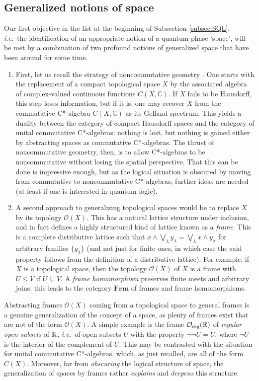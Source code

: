 \documentclass[11pt]{article}
\newcommand{\CO}{{\mathcal O}} \newcommand{\CP}{{\mathcal P}}
\newcommand{\C}{{\mathbb C}} \newcommand{\D}{{\mathbb D}}
\newcommand{\ie}{\textit{i.e.}}
\begin{document}
\subsection{Generalized notions of space}\label{subsection:locale1}
Our first objective in the list at the beginning of Subsection \ref{subsec:SQL}, \ie\ the identification of an appropriate notion of a quantum phase `space',
will be met by a combination of two profound notions of generalized space
that have been around for some time.
\begin{enumerate}
\item
First, let us recall the strategy of
noncommutative geometry  \cite{Connes,ConnesMarcolli}.
 One starts
with the replacement of a compact topological space $X$  by the
associated algebra of complex-valued continuous functions $C(X,\C)$. If
$X$ fails to be Hausdorff, this step loses information, but if it is,
one may recover $X$ from the commutative C*-algebra $C(X,\C)$ as its
Gelfand spectrum. This yields a duality between the category
of compact Hausdorff spaces and the category of unital commutative
C*-algebras: nothing is lost, but nothing is gained either by
abstracting spaces as commutative C*-algebras. The thrust of noncommutative geometry, then, is to allow C*-algebras to be noncommutative
without losing the spatial perspective. That this can be done is
impressive enough, but as the logical situation is obscured by moving from
commutative to noncommutative C*-algebras, further ideas are needed (at least if one is interested in quantum logic).
\item
A second  approach to generalizing  topological spaces
 would be to replace $X$  by its topology $\CO(X)$. This has a natural lattice structure under inclusion, and in fact defines a highly structured kind of lattice known as a
{\it frame}. This is  a complete distributive lattice such that
$x\wedge \bigvee_{\lambda}y_{\lambda}=\bigvee_{\lambda}x\wedge
y_{\lambda}$ for arbitrary families $\{y_{\lambda}\}$ (and not just for finite ones, in which case the said property follows from the definition of a distributive lattice).  For  example, if $X$ is a topological space, then the
topology $\CO(X)$ of $X$ is a frame with $U\leqslant V$ if $U\subseteq V$.
A {\it frame homomorphism} preserves finite meets and arbitrary
joins; this leads to the category $\mathbf{Frm}$  of frames and frame homomorphisms.
\end{enumerate}
Abstracting frames  $\CO(X)$ coming from a topological space  to general frames  is a genuine generalization of the concept of a space, as plenty of frames exist that are not of
the form $\CO(X)$. A simple example is the frame $\CO_{\mathrm{reg}}(\R)$ of {\it regular open subsets} of ${\mathbb R}$, \ie\ of open subsets $U$ with the property $\neg\neg U=U$, where $\neg U$ is the interior of the complement of $U$.
This may be contrasted with the situation for unital commutative
C*-algebras, which, as just recalled, are all  of the form $C(X)$. Moreover, far from {\it obscuring} the logical structure of space, the generalization of spaces by frames  rather {\it explains} and {\it deepens}  this structure.
\end{document}
